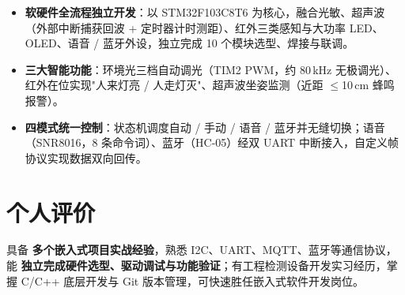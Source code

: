 \documentclass[10pt,a4paper]{article}
\begin{document}
\begin{itemize}[leftmargin=1.5em, itemsep=2pt, parsep=0pt, topsep=2pt]
    \item \textbf{软硬件全流程独立开发}：以 STM32F103C8T6 为核心，融合光敏、超声波（外部中断捕获回波 + 定时器计时测距）、红外三类感知与大功率 LED、OLED、语音 / 蓝牙外设，独立完成 10 个模块选型、焊接与联调。
    \item \textbf{三大智能功能}：环境光三档自动调光（TIM2 PWM，约 80\,kHz 无极调光）、红外在位实现"人来灯亮 / 人走灯灭"、超声波坐姿监测（近距 $\leq$10\,cm 蜂鸣报警）。
    \item \textbf{四模式统一控制}：状态机调度自动 / 手动 / 语音 / 蓝牙并无缝切换；语音（SNR8016，8 条命令词）、蓝牙（HC-05）经双 UART 中断接入，自定义帧协议实现数据双向回传。
\end{itemize}

\vspace{0.1em}

\section{\faUser\hspace{0.4em}个人评价}

具备 \textbf{多个嵌入式项目实战经验}，熟悉 I2C、UART、MQTT、蓝牙等通信协议，能 \textbf{独立完成硬件选型、驱动调试与功能验证}；有工程检测设备开发实习经历，掌握 C/C++ 底层开发与 Git 版本管理，可快速胜任嵌入式软件开发岗位。
\end{document}
